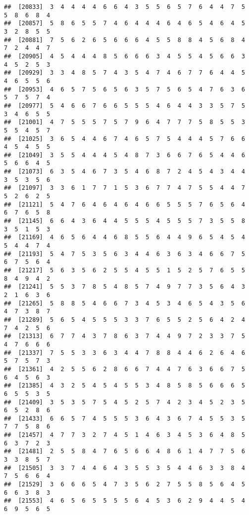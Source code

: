 \documentclass[
]{book}
\begin{document}
\begin{verbatim}
##  [20833]  3  4  4  4  4  6  6  4  3  5  5  6  5  7  6  4  4  7  5  5  8  6  8  4
##  [20857]  5  8  6  5  5  7  4  6  4  4  4  6  4  6  5  4  6  4  5  3  2  8  5  5
##  [20881]  7  5  6  2  6  5  6  6  6  4  5  5  8  8  4  5  6  8  4  7  2  4  4  7
##  [20905]  4  5  4  4  4  8  5  6  6  6  3  4  5  5  4  5  6  6  3  4  5  2  5  3
##  [20929]  3  3  4  8  5  7  4  3  5  4  7  4  6  7  7  6  4  4  5  4  6  5  5  6
##  [20953]  4  6  5  7  5  6  5  6  3  5  7  5  6  5  4  7  6  3  6  5  7  5  7  4
##  [20977]  5  4  6  6  7  6  6  5  5  5  4  6  4  4  3  3  5  7  5  3  4  6  5  5
##  [21001]  4  7  5  5  5  7  5  7  9  6  4  7  7  7  5  8  5  5  3  5  5  4  5  7
##  [21025]  3  6  5  4  4  6  7  4  6  5  7  5  4  4  4  5  7  6  6  4  5  4  5  5
##  [21049]  3  5  5  4  4  4  5  4  8  7  3  6  6  7  6  5  4  4  6  5  6  6  4  5
##  [21073]  6  3  5  4  6  7  3  5  4  6  8  7  2  4  5  4  3  4  4  3  5  3  5  6
##  [21097]  3  3  6  1  7  7  1  5  3  6  7  7  4  7  5  5  4  4  7  5  2  6  2  5
##  [21121]  5  4  7  6  4  6  4  6  4  6  6  5  5  5  7  6  5  6  4  6  7  6  5  8
##  [21145]  6  6  4  3  6  4  4  5  5  5  4  5  5  5  7  3  5  5  8  3  5  1  5  3
##  [21169]  4  6  5  6  4  4  6  8  5  5  6  4  4  9  6  5  4  5  4  5  4  4  7  4
##  [21193]  5  4  7  5  3  5  6  3  4  4  6  3  6  3  4  6  6  7  5  6  7  5  6  4
##  [21217]  5  6  3  5  6  2  5  5  4  5  5  1  5  2  5  7  6  5  5  8  4  9  4  2
##  [21241]  5  5  3  7  8  5  4  8  5  7  4  9  7  7  3  5  6  4  3  2  1  6  3  6
##  [21265]  5  8  8  5  4  6  6  7  3  4  5  3  4  6  5  4  3  5  6  4  7  3  8  7
##  [21289]  5  6  5  4  5  5  5  3  3  7  6  5  5  2  5  6  4  2  4  7  4  2  5  6
##  [21313]  6  7  7  4  3  7  8  6  3  7  4  4  9  7  2  3  3  7  5  4  7  6  6  6
##  [21337]  7  5  5  3  3  6  3  4  4  7  8  8  4  4  6  2  6  4  6  5  7  5  7  3
##  [21361]  4  2  5  5  6  2  8  6  6  7  4  4  7  6  3  6  6  7  5  6  4  5  6  3
##  [21385]  4  3  2  5  4  5  4  5  5  3  4  8  5  8  5  6  6  6  5  6  5  5  3  5
##  [21409]  3  5  3  5  7  5  4  5  2  5  7  4  2  3  4  5  2  3  5  6  5  2  8  6
##  [21433]  6  6  5  7  4  5  5  5  3  6  4  3  6  7  4  5  5  3  5  7  7  5  8  6
##  [21457]  4  7  7  3  2  7  4  5  1  4  6  3  4  5  3  6  4  8  5  6  3  7  2  3
##  [21481]  2  5  5  8  4  7  6  5  6  6  4  8  6  1  4  7  7  5  6  3  3  8  5  7
##  [21505]  3  3  7  4  4  6  4  3  5  5  3  5  4  4  6  3  3  8  4  7  5  6  6  4
##  [21529]  3  6  6  6  5  4  7  3  5  6  2  7  5  5  8  5  6  4  5  6  6  3  8  3
##  [21553]  4  6  5  6  5  5  5  5  6  4  5  3  6  2  9  4  4  5  4  6  9  5  6  5

\end{verbatim}
\end{document}
